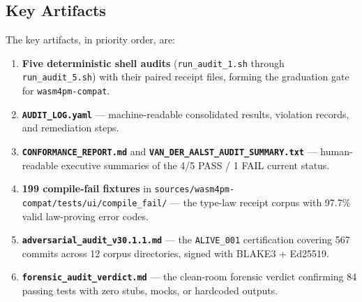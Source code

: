 \subsection{Key Artifacts}
\label{sec:audits-identity-artifacts}

The key artifacts, in priority order, are:

\begin{enumerate}
  \item \textbf{Five deterministic shell audits} (\texttt{run\_audit\_1.sh}
    through \texttt{run\_audit\_5.sh}) with their paired receipt files, forming
    the graduation gate for \texttt{wasm4pm-compat}.
  \item \textbf{\texttt{AUDIT\_LOG.yaml}} --- machine-readable consolidated
    results, violation records, and remediation steps.
  \item \textbf{\texttt{CONFORMANCE\_REPORT.md}} and
    \textbf{\texttt{VAN\_DER\_AALST\_AUDIT\_SUMMARY.txt}} --- human-readable
    executive summaries of the 4/5 PASS / 1 FAIL current status.
  \item \textbf{199 compile-fail fixtures} in
    \texttt{sources/wasm4pm-compat/tests/ui/compile\_fail/} --- the type-law
    receipt corpus with 97.7\% valid law-proving error codes.
  \item \textbf{\texttt{adversarial\_audit\_v30.1.1.md}} --- the
    \texttt{ALIVE\_001} certification covering 567 commits across 12 corpus
    directories, signed with BLAKE3 + Ed25519.
  \item \textbf{\texttt{forensic\_audit\_verdict.md}} --- the clean-room
    forensic verdict confirming 84 passing tests with zero stubs, mocks, or
    hardcoded outputs.
\end{enumerate}
